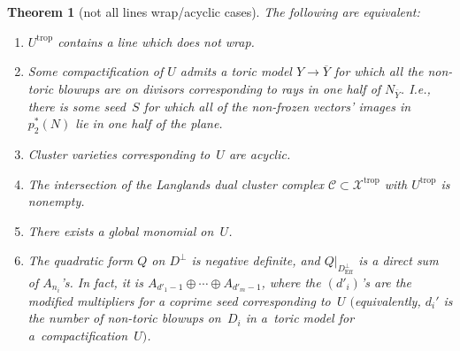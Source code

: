 \documentclass[pdftex]{sigma}
\numberwithin{equation}{section}
\numberwithin{figure}{section}
\numberwithin{table}{section}
\DeclareMathOperator{\trop}{trop}
\DeclareMathOperator{\Eff}{Eff}
\let\?=\overline
\let\rar=\rightarrow
\let\s=\mathcal
\newtheorem{thm}{Theorem}[section]
\theoremstyle{definition}
\begin{document}
\begin{thm}[not all lines wrap/acyclic cases]\label{not-all-wrap}
The following are equivalent:
\begin{enumerate}\itemsep=0pt
\item[$1.$] $U^{\trop}$ contains a {line} which does not wrap.
\item[$2.$] Some compactification of $U$ admits a toric model $Y\rar \?{Y}$ for which all the non-toric blowups are on divisors corresponding to rays in one half of $N_{\?{Y}}$. I.e., there is some seed~$S$ for which all of the non-frozen vectors' images in~$p_2^*(N)$ lie in one half of the plane.
\item[$3.$] Cluster varieties corresponding to~$U$ are {acyclic}.
\item[$4.$] The intersection of the Langlands dual {cluster complex} $\s{C}\subset \s{X}^{\trop}$ with $U^{\trop}$ is non\-empty.
\item[$5.$] There exists a {global monomial} on~$U$.
\item[$6.$] The {quadratic form} $Q$ on $D^{\perp}$ is negative definite, and $Q|_{D^{\perp}_{\Eff}}$ is a direct sum of $A_{n_i}$'s. In fact, it is $A_{d'_1-1}\oplus \cdots \oplus A_{d'_m-1}$, where the $(d'_i)$'s are the modified multipliers for a coprime seed corresponding to~$U$ $($equivalently, $d_i'$ is the number of non-toric blowups on~$D_i$ in a~toric model for a~compactification~$U)$.
\end{enumerate}
\end{thm}
\end{document}
